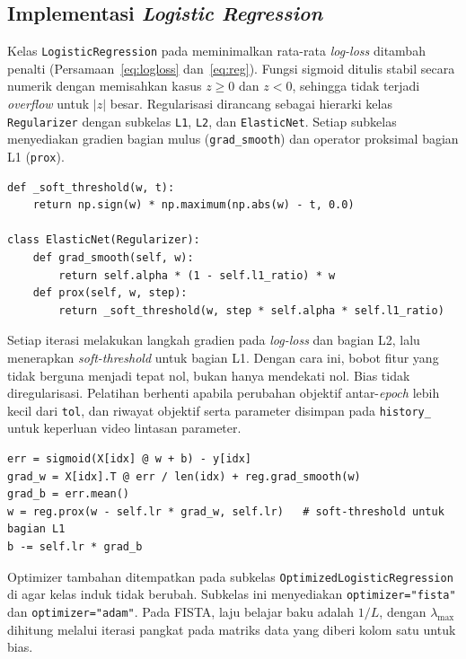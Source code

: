 \subsection{Implementasi \textit{Logistic Regression}}
Kelas \texttt{LogisticRegression} pada  meminimalkan rata-rata \textit{log-loss} ditambah penalti (Persamaan~\ref{eq:logloss} dan~\ref{eq:reg}). Fungsi sigmoid ditulis stabil secara numerik dengan memisahkan kasus $z\geq0$ dan $z<0$, sehingga tidak terjadi \textit{overflow} untuk $|z|$ besar. Regularisasi dirancang sebagai hierarki kelas \texttt{Regularizer} dengan subkelas \texttt{L1}, \texttt{L2}, dan \texttt{ElasticNet}. Setiap subkelas menyediakan gradien bagian mulus (\texttt{grad\_smooth}) dan operator proksimal bagian L1 (\texttt{prox}).

\begin{lstlisting}[emph={ElasticNet,_soft_threshold},caption={Regularizer Elastic Net dengan langkah proksimal (\texttt{src/logreg.py})},label={lst:lr-reg}]
def _soft_threshold(w, t):
    return np.sign(w) * np.maximum(np.abs(w) - t, 0.0)

class ElasticNet(Regularizer):
    def grad_smooth(self, w):
        return self.alpha * (1 - self.l1_ratio) * w
    def prox(self, w, step):
        return _soft_threshold(w, step * self.alpha * self.l1_ratio)
\end{lstlisting}

Setiap iterasi melakukan langkah gradien pada \textit{log-loss} dan bagian L2, lalu menerapkan \textit{soft-threshold} untuk bagian L1. Dengan cara ini, bobot fitur yang tidak berguna menjadi tepat nol, bukan hanya mendekati nol. Bias tidak diregularisasi. Pelatihan berhenti apabila perubahan objektif antar-\textit{epoch} lebih kecil dari \texttt{tol}, dan riwayat objektif serta parameter disimpan pada \texttt{history\_} untuk keperluan video lintasan parameter.

\begin{lstlisting}[caption={Langkah pembaruan \textit{gradient descent} proksimal (\texttt{src/logreg.py}, diringkas)},label={lst:lr-fit}]
err = sigmoid(X[idx] @ w + b) - y[idx]
grad_w = X[idx].T @ err / len(idx) + reg.grad_smooth(w)
grad_b = err.mean()
w = reg.prox(w - self.lr * grad_w, self.lr)   # soft-threshold untuk bagian L1
b -= self.lr * grad_b
\end{lstlisting}

Optimizer tambahan ditempatkan pada subkelas \texttt{OptimizedLogisticRegression} di  agar kelas induk tidak berubah. Subkelas ini menyediakan \texttt{optimizer="fista"} dan \texttt{optimizer="adam"}. Pada FISTA, laju belajar baku adalah $1/L$, dengan $\lambda_{\max}$ dihitung melalui iterasi pangkat pada matriks data yang diberi kolom satu untuk bias.

